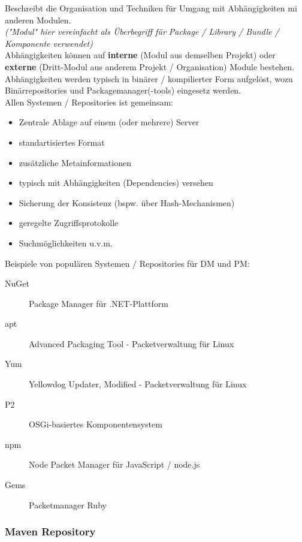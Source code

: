 \documentclass[a4paper]{article}
\begin{document}
	Beschreibt die Organisation und Techniken für Umgang mit Abhängigkeiten mi anderen Modulen.\\
	\textit{("Modul" hier vereinfacht als Überbegriff für Package / Library / Bundle / Komponente verwendet)}\\
	Abhängigkeiten können auf \textbf{interne} (Modul aus demselben Projekt) oder \textbf{externe} (Dritt-Modul aus anderem Projekt / Organisation) Module bestehen.
	Abhängigkeiten werden typisch in binärer / kompilierter Form aufgelöst, wozu Binärrepositories und Packagemanager(-tools) eingesetz werden.\\
	Allen Systemen / Repositories ist gemeinsam:
	\begin{itemize}
		\item Zentrale Ablage auf einem (oder mehrere) Server
		\item standartisiertes Format
		\item zusätzliche Metainformationen
		\item typisch mit Abhängigkeiten (Dependencies) versehen
		\item Sicherung der Konsistenz (bspw. über Hash-Mechanismen)
		\item geregelte Zugriffsprotokolle
		\item Suchmöglichkeiten u.v.m.
	\end{itemize}
	\vspace{1em}
	Beispiele von populären Systemen / Repositories für DM und PM:
	\begin{description}
		\item[NuGet] Package Manager für .NET-Plattform
		\item[apt] Advanced Packaging Tool - Packetverwaltung für Linux
		\item[Yum] Yellowdog Updater, Modified - Packetverwaltung für Linux
		\item[P2] OSGi-basiertes Komponentensystem
		\item[npm] Node Packet Manager für JavaScript / node.js
		\item[Gems] Packetmanager Ruby
	\end{description}
	
		\subsubsection{Maven Repository}
		
\end{document}
